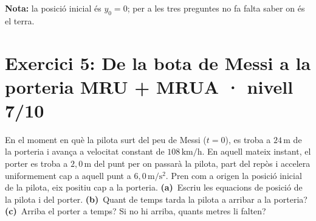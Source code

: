\documentclass[11pt,a4paper]{article}
\begin{document}
\begin{center}
\end{center}

\textbf{Nota:} la posició inicial és $y_0=0$; per a les tres preguntes no fa falta saber on és el terra.

\clearpage

\section*{Exercici 5: De la bota de Messi a la porteria \hfill \normalfont MRU + MRUA · nivell 7/10}

En el moment en què la pilota surt del peu de Messi ($t=0$), es troba a $24\,\mathrm{m}$ de la porteria i avança a velocitat constant de $108\,\mathrm{km/h}$. En aquell mateix instant, el porter es troba a $2{,}0\,\mathrm{m}$ del punt per on passarà la pilota, part del repòs i accelera uniformement cap a aquell punt a $6{,}0\,\mathrm{m/s^2}$. Pren com a origen la posició inicial de la pilota, eix positiu cap a la porteria. \textbf{(a)}~Escriu les equacions de posició de la pilota i del porter. \textbf{(b)}~Quant de temps tarda la pilota a arribar a la porteria? \textbf{(c)}~Arriba el porter a temps? Si no hi arriba, quants metres li falten?
\end{document}
